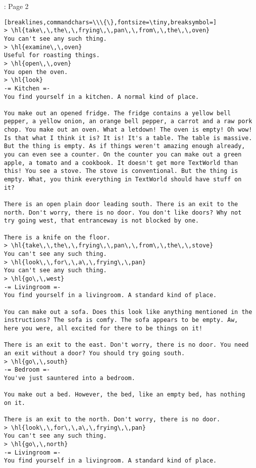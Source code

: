 \begin{AIbox}[width=0.9\textwidth]{\DV: Page 2}
\begin{Verbatim}[breaklines,commandchars=\\\{\},fontsize=\tiny,breaksymbol=]
> \hl{take\,\,the\,\,frying\,\,pan\,\,from\,\,the\,\,oven}
You can't see any such thing.
> \hl{examine\,\,oven}
Useful for roasting things.
> \hl{open\,\,oven}
You open the oven.
> \hl{look}
-= Kitchen =-
You find yourself in a kitchen. A normal kind of place.

You make out an opened fridge. The fridge contains a yellow bell pepper, a yellow onion, an orange bell pepper, a carrot and a raw pork chop. You make out an oven. What a letdown! The oven is empty! Oh wow! Is that what I think it is? It is! It's a table. The table is massive. But the thing is empty. As if things weren't amazing enough already, you can even see a counter. On the counter you can make out a green apple, a tomato and a cookbook. It doesn't get more TextWorld than this! You see a stove. The stove is conventional. But the thing is empty. What, you think everything in TextWorld should have stuff on it?

There is an open plain door leading south. There is an exit to the north. Don't worry, there is no door. You don't like doors? Why not try going west, that entranceway is not blocked by one.

There is a knife on the floor.
> \hl{take\,\,the\,\,frying\,\,pan\,\,from\,\,the\,\,stove}
You can't see any such thing.
> \hl{look\,\,for\,\,a\,\,frying\,\,pan}
You can't see any such thing.
> \hl{go\,\,west}
-= Livingroom =-
You find yourself in a livingroom. A standard kind of place.

You can make out a sofa. Does this look like anything mentioned in the instructions? The sofa is comfy. The sofa appears to be empty. Aw, here you were, all excited for there to be things on it!

There is an exit to the east. Don't worry, there is no door. You need an exit without a door? You should try going south.
> \hl{go\,\,south}
-= Bedroom =-
You've just sauntered into a bedroom.

You make out a bed. However, the bed, like an empty bed, has nothing on it.

There is an exit to the north. Don't worry, there is no door.
> \hl{look\,\,for\,\,a\,\,frying\,\,pan}
You can't see any such thing.
> \hl{go\,\,north}
-= Livingroom =-
You find yourself in a livingroom. A standard kind of place.


\end{Verbatim}
\end{AIbox}
